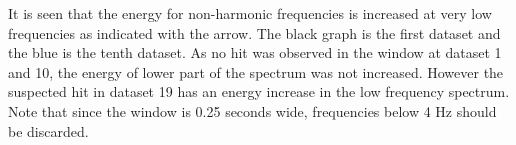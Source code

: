 It is seen that the energy for non-harmonic frequencies is increased at very low frequencies as indicated with the arrow. The black graph is the first dataset and the blue is the tenth dataset. As no hit was observed in the window at dataset 1 and 10, the energy of lower part of the spectrum was not increased. However the suspected hit in dataset 19 has an energy increase in  the low frequency spectrum. Note that since the window is 0.25 seconds wide, frequencies below 4 Hz should be discarded.




















